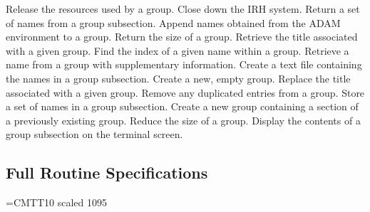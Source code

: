    {Release the resources used by a group.}
   {Close down the IRH system.}
   {Return a set of names from a group subsection.}
   {Append names obtained from the ADAM environment to a group.}
   {Return the size of a group.}
   {Retrieve the title associated with a given group.}
   {Find the index of a given name within a group.}
   {Retrieve a name from a group with supplementary information.}
   {Create a text file containing the names in a group subsection.}
   {Create a new, empty group.}
   {Replace the title associated with a given group.}
   {Remove any duplicated entries from a group.}
   {Store a set of names in a group subsection.}
   {Create a new group containing a section of a previously existing group.}
   {Reduce the size of a group.}
   {Display the contents of a group subsection on the terminal screen.}

\subsection {Full Routine Specifications}
\label {SEC:FULLSPEC}
\newlength{\sstbannerlength}
\newlength{\sstcaptionlength}
\font\ssttt=CMTT10 scaled 1095
\newcommand{\sstroutine}[3]{
   \goodbreak
   \rule{\textwidth}{0.5mm}
   \vspace{-7ex}
   \newline
   \settowidth{\sstbannerlength}{{\Large {\bf #1}}}
   \setlength{\sstcaptionlength}{\textwidth}
   \addtolength{\sstbannerlength}{0.5em} 
   \addtolength{\sstcaptionlength}{-2.0\sstbannerlength}
   \addtolength{\sstcaptionlength}{-4.45pt}
   \parbox[t]{\sstbannerlength}{\flushleft{\Large {\bf #1}}}
   \parbox[t]{\sstcaptionlength}{\center{\Large #2}}
   \parbox[t]{\sstbannerlength}{\flushright{\Large {\bf #1}}}
   \begin{description}
      #3
   \end{description}
}

